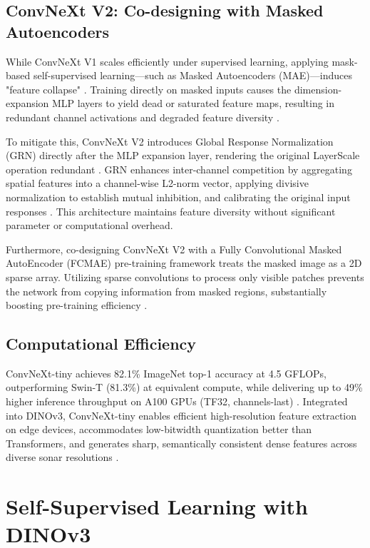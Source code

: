 \documentclass[12pt]{article}
\begin{document}
\subsection{ConvNeXt V2: Co-designing with Masked Autoencoders}

While ConvNeXt V1 scales efficiently under supervised learning, applying mask-based self-supervised learning—such as Masked Autoencoders (MAE)—induces "feature collapse" \cite{ConvNextV2}. Training directly on masked inputs causes the dimension-expansion MLP layers to yield dead or saturated feature maps, resulting in redundant channel activations and degraded feature diversity \cite{ConvNextV2}.

To mitigate this, ConvNeXt V2 introduces Global Response Normalization (GRN) directly after the MLP expansion layer, rendering the original LayerScale operation redundant \cite{ConvNextV2}. GRN enhances inter-channel competition by aggregating spatial features into a channel-wise L2-norm vector, applying divisive normalization to establish mutual inhibition, and calibrating the original input responses \cite{ConvNextV2}. This architecture maintains feature diversity without significant parameter or computational overhead.

Furthermore, co-designing ConvNeXt V2 with a Fully Convolutional Masked AutoEncoder (FCMAE) pre-training framework treats the masked image as a 2D sparse array. Utilizing sparse convolutions to process only visible patches prevents the network from copying information from masked regions, substantially boosting pre-training efficiency \cite{ConvNextV2}.

\subsection{Computational Efficiency}

ConvNeXt-tiny achieves 82.1\% ImageNet top-1 accuracy at 4.5 GFLOPs, outperforming Swin-T (81.3\%) at equivalent compute, while delivering up to 49\% higher inference throughput on A100 GPUs (TF32, channels-last) \cite{liu2022}. Integrated into DINOv3, ConvNeXt-tiny enables efficient high-resolution feature extraction on edge devices, accommodates low-bitwidth quantization better than Transformers, and generates sharp, semantically consistent dense features across diverse sonar resolutions \cite{oriane2025, hayat2025, fu2025}.

\section{Self-Supervised Learning with DINOv3}
\end{document}
